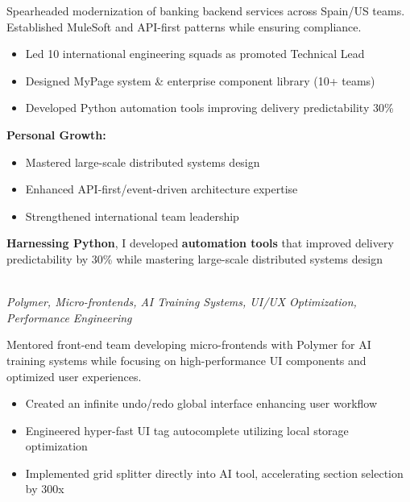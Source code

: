\documentclass[a4paper,10pt]{article}
\newcommand{\experiencebreak}{\needspace{18\baselineskip}}
\begin{document}
Spearheaded modernization of banking backend services across Spain/US teams. Established MuleSoft and API-first patterns while ensuring compliance.

\vspace{0.2cm}
\begin{itemize}[label=\textcolor{darkblue}{\textbullet}, leftmargin=*, nosep]
	\item Led 10 international engineering squads as promoted Technical Lead
	\item Designed MyPage system \& enterprise component library (10+ teams)
	\item Developed Python automation tools improving delivery predictability 30\%
\end{itemize}

\vspace{0.2cm}
\textbf{Personal Growth:}
\vspace{0.2cm}
\begin{itemize}[label=\textcolor{darkblue}{\textbullet}, leftmargin=*, nosep]
	\item Mastered large-scale distributed systems design
	\item Enhanced API-first/event-driven architecture expertise
	\item Strengthened international team leadership
\end{itemize}

\vspace{0.2cm}

\textbf{Harnessing Python}, I developed \textbf{automation tools} that improved delivery predictability by 30\% while mastering large-scale distributed systems design

\vspace{0.4cm}

\experiencebreak
\noindent\uline{} \\
\vspace{0.1cm} \hspace{0.2cm}
{\small\textit{Polymer, Micro-frontends, AI Training Systems, UI/UX Optimization, Performance Engineering}}

Mentored front-end team developing micro-frontends with Polymer for AI training systems while focusing on high-performance UI components and optimized user experiences.

\vspace{0.2cm}
\begin{itemize}[label=\textcolor{darkblue}{\textbullet}, leftmargin=*, nosep]
	\item Created an infinite undo/redo global interface enhancing user workflow
	\item Engineered hyper-fast UI tag autocomplete utilizing local storage optimization
	\item Implemented grid splitter directly into AI tool, accelerating section selection by 300x
\end{itemize}
\end{document}
